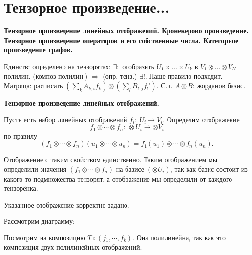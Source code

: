 \section{
 Тензорное произведение... %
}

\textbf{Тензорное произведение линейных отображений. Кронекерово произведение. Тензорное произведение операторов и его собственные числа. Категорное произведение графов.}

Единств: определено на тензорятах; $\exists:$ отобразить $U_1\times\dots\times U_k$ в $V_1\otimes\dots\otimes V_K$ полилин. (композ полилин.) $\Rightarrow$ (опр. тенз.) $\exists!$. Наше правило подходит. Матрица: расписать $(\sum\limits_{k} A_{k, i} f_k)\otimes(\sum\limits_{l} B_{l, j} f_l')$. С.ч. $A\otimes B$: жорданов базис.

\dfn
	{\bf Тензорное произведение линейных отображений.}

	Пусть есть набор линейных отображений $f_i:\ U_i\to V_i$. Определим отображение
	$$
	f_1\otimes\cdots\otimes f_n:\ \otimes U_i\to\otimes V_i
	$$
	по правилу
	$$
	(f_1\otimes\cdots\otimes f_n)(u_1\otimes\cdots\otimes u_n) = f_1(u_1)\otimes\cdots\otimes f_n(u_n).
	$$
\edfn

\lm
	Отображение с таким свойством единственно.
	\proof
		Таким отображением мы определили значения $(f_1\otimes \cdots\otimes f_n)$ на базисе $(\otimes U_i)$, так как базис состоит из какого-то подмножества тензорят, а отображение мы определили от каждого тензорёнка.
	\endproof
\elm

\lm Указанное отображение корректно задано.

	\proof

		Рассмотрим диаграмму:
\begin{center}
\end{center}

		Посмотрим на композицию $T\circ (f_1, \cdots, f_k)$. Она полилинейна, так как это композиция двух полилинейных отображений.

